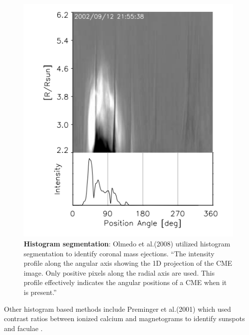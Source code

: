 \documentclass[twoside]{report}
\begin{document}
\begin{figure}[ht]
  \begin{center}
    \includegraphics[scale=1]{olmedo.png}
    \caption{{\bf Histogram segmentation}: Olmedo et al.(2008) utilized histogram segmentation to identify coronal mass ejections. ``The intensity profile along the angular axis showing the 1D projection of the CME image. Only positive pixels along the radial axis are used. This profile effectively indicates the angular positions of a CME when it is present.'' \cite{olmedo2008automatic}}
    \label{fig:olmedo}
 \end{center}
\end{figure}


Other histogram based methods include Preminger et al.(2001) which used contrast ratios between ionized calcium and magnetograms to identify sunspots and faculae \cite{preminger}.
\end{document}
